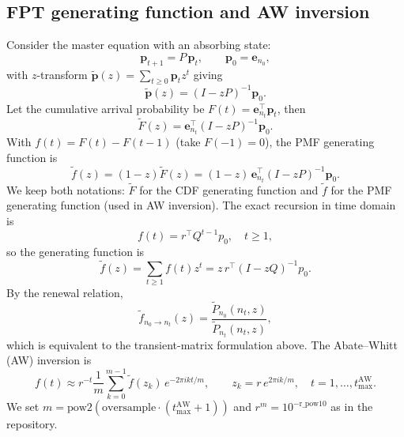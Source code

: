 \documentclass[11pt]{article}
\begin{document}
\subsection{FPT generating function and AW inversion}
Consider the master equation with an absorbing state:
\begin{equation}
  \mathbf{p}_{t+1}=P\,\mathbf{p}_t,\qquad \mathbf{p}_0=\mathbf{e}_{n_0},
\end{equation}
with $z$-transform $\tilde{\mathbf{p}}(z)=\sum_{t\ge 0}\mathbf{p}_t z^t$ giving
\begin{equation}
  \tilde{\mathbf{p}}(z)=(I-zP)^{-1}\mathbf{p}_0.
\end{equation}
Let the cumulative arrival probability be $F(t)=\mathbf{e}_{n_t}^\top \mathbf{p}_t$, then
\begin{equation}
  \tilde F(z)=\mathbf{e}_{n_t}^\top (I-zP)^{-1}\mathbf{p}_0.
\end{equation}
With $f(t)=F(t)-F(t-1)$ (take $F(-1)=0$), the PMF generating function is
\begin{equation}
  \tilde f(z)=(1-z)\tilde F(z)=(1-z)\,\mathbf{e}_{n_t}^\top (I-zP)^{-1}\mathbf{p}_0.
\end{equation}
We keep both notations: $\tilde F$ for the CDF generating function and $\tilde f$ for the PMF generating function (used in AW inversion). The exact recursion in time domain is
\begin{equation}
  f(t)=r^\top Q^{t-1} p_0,\quad t\ge 1,
  \label{eq:exact-recursion}
\end{equation}
so the generating function is
\begin{equation}
  \tilde f(z)=\sum_{t\ge 1} f(t) z^t
  = z\,r^\top (I-zQ)^{-1} p_0.
\end{equation}
By the renewal relation,
\begin{equation}
  \tilde f_{n_0\to n_t}(z)=\frac{\tilde P_{n_0}(n_t,z)}{\tilde P_{n_t}(n_t,z)},
  \label{eq:Fz}
\end{equation}
which is equivalent to the transient-matrix formulation above. The Abate--Whitt (AW) inversion is
\begin{equation}
  f(t)\approx r^{-t}\frac{1}{m}\sum_{k=0}^{m-1}\tilde f(z_k)\,e^{-2\pi i k t/m},
  \qquad z_k=r\,e^{2\pi i k/m},\quad t=1,\dots,t_{\max}^{\mathrm{AW}}.
  \label{eq:AW}
\end{equation}
We set $m=\mathrm{pow2}(\text{oversample}\cdot(t_{\max}^{\mathrm{AW}}+1))$ and $r^m=10^{-\text{r\_pow10}}$ as in the repository.
\end{document}
